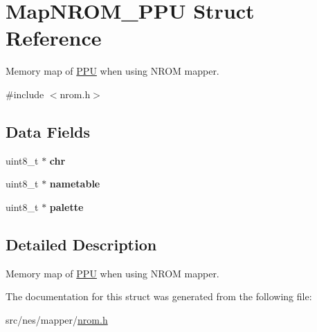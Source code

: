\hypertarget{struct_map_n_r_o_m___p_p_u}{}\section{Map\+N\+R\+O\+M\+\_\+\+P\+PU Struct Reference}
\label{struct_map_n_r_o_m___p_p_u}


Memory map of \hyperlink{struct_p_p_u}{P\+PU} when using N\+R\+OM mapper.  




{\ttfamily \#include $<$nrom.\+h$>$}

\subsection*{Data Fields}
\begin{DoxyCompactItemize}
\item 
\mbox{\label{struct_map_n_r_o_m___p_p_u_a17b2c8b808feb624a4ba042b1389bcdd}} 
uint8\+\_\+t $\ast$ {\bfseries chr}
\item 
\mbox{\label{struct_map_n_r_o_m___p_p_u_ab200315b5565da275df8d5ed67152b1c}} 
uint8\+\_\+t $\ast$ {\bfseries nametable}
\item 
\mbox{\label{struct_map_n_r_o_m___p_p_u_a8b0a4284623f652d89a87c675d8f81a0}} 
uint8\+\_\+t $\ast$ {\bfseries palette}
\end{DoxyCompactItemize}


\subsection{Detailed Description}
Memory map of \hyperlink{struct_p_p_u}{P\+PU} when using N\+R\+OM mapper. 

The documentation for this struct was generated from the following file\+:\begin{DoxyCompactItemize}
\item 
src/nes/mapper/\hyperlink{nrom_8h}{nrom.\+h}\end{DoxyCompactItemize}
